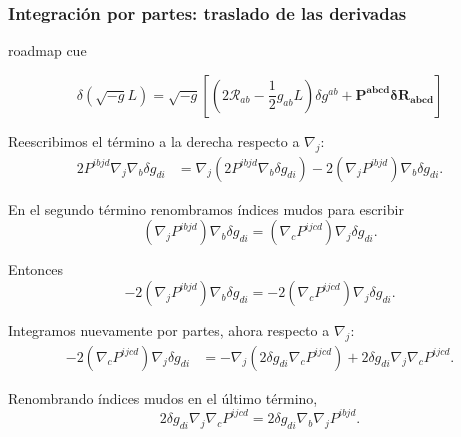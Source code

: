 \documentclass{beamer}
\newcommand{\Rcal}{\mathcal{R}}
\newcommand{\RoadmapCue}[1]{%
    \begin{beamercolorbox}[
        wd=\textwidth,
        sep=.55ex,
        leftskip=.8ex,
        rounded=true
    ]{roadmap cue}

    \scriptsize
    \enspace #1

    \end{beamercolorbox}

    \vspace{.25em}
}
\begin{document}
\begin{frame}[label=nav-frame-030]
\frametitle{Integración por partes: traslado de las derivadas}
\scriptsize
\RoadmapCue{
\[
\delta(\sqrt{-g}L)
=
\sqrt{-g}
\left[
\left(2\Rcal_{ab}-\frac12g_{ab}L\right)\delta g^{ab}
+ \bm{P^{abcd}\delta R_{abcd}}
\right]
\]
}

Reescribimos el término a la derecha respecto a \(\nabla_j\):
\[
\begin{aligned}
2P^{ibjd}\nabla_j\nabla_b\delta g_{di}
&=
\nabla_j\left(
2P^{ibjd}\nabla_b\delta g_{di}
\right)
-
2(\nabla_jP^{ibjd})\nabla_b\delta g_{di}.
\end{aligned}
\]


En el segundo término renombramos índices mudos para escribir
\[
(\nabla_jP^{ibjd})\nabla_b\delta g_{di}
=
(\nabla_cP^{ijcd})\nabla_j\delta g_{di}.
\]

Entonces
\[
-2(\nabla_jP^{ibjd})\nabla_b\delta g_{di}
=
-2(\nabla_cP^{ijcd})\nabla_j\delta g_{di}.
\]


Integramos nuevamente por partes, ahora respecto a \(\nabla_j\):
\[
\begin{aligned}
-2(\nabla_cP^{ijcd})\nabla_j\delta g_{di}
&=
-\nabla_j
\left(
2\delta g_{di}\nabla_cP^{ijcd}
\right)
+
2\delta g_{di}\nabla_j\nabla_cP^{ijcd}.
\end{aligned}
\]

Renombrando índices mudos en el último término,
\[
2\delta g_{di}\nabla_j\nabla_cP^{ijcd}
=
2\delta g_{di}\nabla_b\nabla_jP^{ibjd}.
\]
\end{frame}
\end{document}
